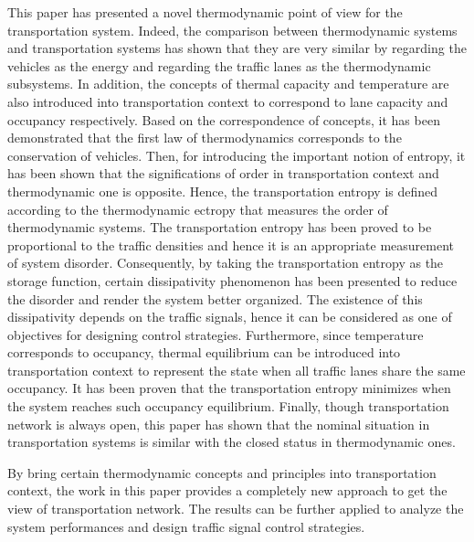 \documentclass[preprint,authoryear,12pt]{elsarticle}
\begin{document}
This paper has presented a novel thermodynamic point of view for the transportation system. Indeed, the comparison between thermodynamic systems and transportation systems has shown that they are very similar by regarding the vehicles as the energy and regarding the traffic lanes as the thermodynamic subsystems. In addition, the concepts of thermal capacity and temperature are also introduced into transportation context to correspond to lane capacity and occupancy respectively. Based on the correspondence of concepts, it has been demonstrated that the first law of thermodynamics corresponds to the conservation of vehicles.
Then, for introducing the important notion of entropy, it has been shown that the significations of order in transportation context and thermodynamic one is opposite. Hence, the transportation entropy is defined according to the thermodynamic ectropy that measures the order of thermodynamic systems. The transportation entropy has been proved to be proportional to the traffic densities and hence it is an appropriate measurement of system disorder.
Consequently, by taking the transportation entropy as the storage function, certain dissipativity phenomenon has been presented to reduce the disorder and render the system better organized. The existence of this dissipativity depends on the traffic signals, hence it can be considered as one of objectives for designing control strategies.
Furthermore, since temperature corresponds to occupancy, thermal equilibrium can be introduced into transportation context to represent the state when all traffic lanes share the same occupancy. It has been proven that the transportation entropy minimizes when the system reaches such occupancy equilibrium.
Finally, though transportation network is always open, this paper has shown that the nominal situation in transportation systems is similar with the closed status in thermodynamic ones.

By bring certain thermodynamic concepts and principles into transportation context, the work in this paper provides a completely new approach to get the view of transportation network. The results can be further applied to analyze the system performances and design traffic signal control strategies.



\end{document}
